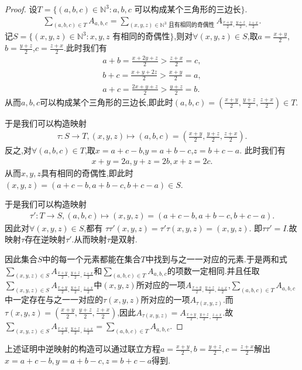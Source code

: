 \documentclass[../../main.tex]{subfiles}%
\begin{document}
\begin{proof}

设\(T = \{ (a,b,c) \in \mathbb{N}^3 : a,b,c\text{ 可以构成某个三角形的三边长}\}\).
\begin{align*}
\sum\limits_{(a,b,c) \in T}A_{a,b,c} = \sum\limits_{(x,y,z) \in \mathbb{N}^3\text{ 且有相同的奇偶性}}A_{\frac{x + y}{2},\frac{y + z}{2},\frac{z + x}{2}}.
\end{align*}
记\(S = \{ (x,y,z) \in \mathbb{N}^3 : x,y,z\text{ 有相同的奇偶性}\}\),则对\(\forall (x,y,z) \in S\),取\(a = \frac{x + y}{2}\),\(b = \frac{y + z}{2}\),\(c = \frac{z + x}{2}\).此时我们有
\begin{align*}
a + b = \frac{x + 2y + z}{2} > \frac{z + x}{2} = c,
\\
b + c = \frac{x + y + 2z}{2} > \frac{x + y}{2} = a,
\\
a + c = \frac{2x + y + z}{2} > \frac{y + z}{2} = b.
\end{align*}
从而\(a,b,c\)可以构成某个三角形的三边长,即此时\((a,b,c) = (\frac{x + y}{2},\frac{y + z}{2},\frac{z + x}{2}) \in T\).

于是我们可以构造映射
\begin{align*}
\tau : S \to T,(x,y,z) \mapsto (a,b,c) = (\frac{x + y}{2},\frac{y + z}{2},\frac{z + x}{2}).
\end{align*}
反之,对\(\forall (a,b,c) \in T\),取\(x = a + c - b\),\(y = a + b - c\),\(z = b + c - a\).
此时我们有
\begin{align*}
x + y = 2a,y + z = 2b,x + z = 2c.
\end{align*}
从而\(x,y,z\)具有相同的奇偶性,即此时\((x,y,z) = (a + c - b,a + b - c,b + c - a) \in S\).

于是我们可以构造映射
\begin{align*}
\tau': T \to S,(a,b,c) \mapsto (x,y,z) = (a + c - b,a + b - c,b + c - a).
\end{align*}
因此对\(\forall (x,y,z) \in S\),都有
\(\tau\tau'(x,y,z) = \tau'\tau(x,y,z) = (x,y,z)\).
即\(\tau\tau' = I\).故映射\(\tau\)存在逆映射\(\tau'\).从而映射\(\tau\)是双射.

因此集合\(S\)中的每一个元素都能在集合\(T\)中找到与之一一对应的元素.于是两和式\(\sum\limits_{(x,y,z) \in S}A_{\frac{x + y}{2},\frac{y + z}{2},\frac{z + x}{2}}\)和\(\sum\limits_{(a,b,c) \in T}A_{a,b,c}\)的项数一定相同.并且任取\(\sum\limits_{(x,y,z) \in S}A_{\frac{x + y}{2},\frac{y + z}{2},\frac{z + x}{2}}\)中\((x,y,z)\)所对应的一项\(A_{\frac{x + y}{2},\frac{y + z}{2},\frac{z + x}{2}}\),\(\sum\limits_{(a,b,c) \in T}A_{a,b,c}\)中一定存在与之一一对应的\(\tau(x,y,z)\)所对应的一项\(A_{\tau(x,y,z)}\).而\(\tau(x,y,z) = (\frac{x + y}{2},\frac{y + z}{2},\frac{z + x}{2})\),因此\(A_{\tau(x,y,z)} = A_{\frac{x + y}{2},\frac{y + z}{2},\frac{z + x}{2}}\).故\(\sum\limits_{(x,y,z) \in S}A_{\frac{x + y}{2},\frac{y + z}{2},\frac{z + x}{2}} = \sum\limits_{(a,b,c) \in T}A_{a,b,c}\). 

\end{proof}
\begin{remark}
上述证明中逆映射的构造可以通过联立方程$a=\frac{x+y}{2},b=\frac{y+z}{2},c=\frac{z+x}{2}$解出$x=a+c-b,y=a+b-c,z=b+c-a$得到.
\end{remark}
\end{document}
